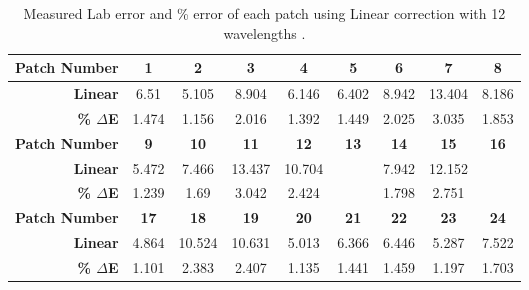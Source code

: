 \begin{table}[H]
  \caption{Measured Lab error and \% error of each patch using Linear correction with 12 wavelengths .}\n  \begin{center}
    \begin{tabularx}{\textwidth}{r c c c c c c c c}
    \toprule
        \textbf{Patch Number} & \textbf{1} & \textbf{2} & \textbf{3} & \textbf{4} & \textbf{5} & \textbf{6} & \textbf{7} & \textbf{8}\\ \midrule 
        \textbf{Linear} &6.51 &5.105 &8.904 &6.146 &6.402 &8.942 &13.404 &8.186\\ 
        \textbf{\textbf{\% $\Delta$E}} &1.474 &1.156 &2.016 &1.392 &1.449 &2.025 &3.035 &1.853\\ \midrule 
        \textbf{Patch Number} & \textbf{9} & \textbf{10} & \textbf{11} & \textbf{12} & \textbf{13} & \textbf{14} & \textbf{15} & \textbf{16}\\ \midrule 
        \textbf{Linear} &5.472 &7.466 &13.437 &10.704 &\cellcolor{colorgreen}{4.744} &7.942 &12.152 &\cellcolor{colorred}{15.425}\\ 
        \textbf{\textbf{\% $\Delta$E}} &1.239 &1.69 &3.042 &2.424 &\cellcolor{colorgreen}{1.074} &1.798 &2.751 &\cellcolor{colorred}{3.492}\\ \midrule 
        \textbf{Patch Number} & \textbf{17} & \textbf{18} & \textbf{19} & \textbf{20} & \textbf{21} & \textbf{22} & \textbf{23} & \textbf{24}\\ \midrule 
        \textbf{Linear} &4.864 &10.524 &10.631 &5.013 &6.366 &6.446 &5.287 &7.522\\ 
        \textbf{\textbf{\% $\Delta$E}} &1.101 &2.383 &2.407 &1.135 &1.441 &1.459 &1.197 &1.703\\ \midrule 
    \bottomrule
    \end{tabularx}
  \end{center}
\end{table}

